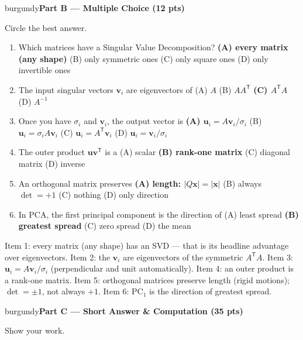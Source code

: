 \documentclass[10pt]{article}
\newcommand{\xx}{\mathbf{x}}
\newcommand{\vv}{\mathbf{v}}
\newcommand{\uu}{\mathbf{u}}
\newcommand{\T}{^{\mathsf T}}
\newcommand{\parthead}[1]{%
  \vspace{6pt}\noindent
  \begin{headlinebox}{burgundy}{\color{white}\bfseries #1}\end{headlinebox}%
  \vspace{4pt}}
\begin{document}
\parthead{Part B --- Multiple Choice (12 pts)}
Circle the best answer.

\begin{enumerate}[leftmargin=1.9em, itemsep=9pt]
  \item Which matrices have a Singular Value Decomposition?
    \hfill \textbf{(A) every matrix (any shape)} \ans{$\leftarrow$} \quad (B) only symmetric ones \quad (C) only square ones \quad (D) only invertible ones
  \item The input singular vectors $\vv_i$ are eigenvectors of
    \hfill (A) $A$ \quad (B) $AA\T$ \quad \textbf{(C) $A\T A$} \ans{$\leftarrow$} \quad (D) $A^{-1}$
  \item Once you have $\sigma_i$ and $\vv_i$, the output vector is
    \hfill \textbf{(A) $\uu_i=A\vv_i/\sigma_i$} \ans{$\leftarrow$} \quad (B) $\uu_i=\sigma_i A\vv_i$ \quad (C) $\uu_i=A\T\vv_i$ \quad (D) $\uu_i=\vv_i/\sigma_i$
  \item The outer product $\uu\vv\T$ is a
    \hfill (A) scalar \quad \textbf{(B) rank-one matrix} \ans{$\leftarrow$} \quad (C) diagonal matrix \quad (D) inverse
  \item An orthogonal matrix preserves
    \hfill \textbf{(A) length: $|Q\xx|=|\xx|$} \ans{$\leftarrow$} \quad (B) always $\det=+1$ \quad (C) nothing \quad (D) only direction
  \item In PCA, the first principal component is the direction of
    \hfill (A) least spread \quad \textbf{(B) greatest spread} \ans{$\leftarrow$} \quad (C) zero spread \quad (D) the mean
\end{enumerate}

\begin{teachernote}
Item 1: every matrix (any shape) has an SVD --- that is its headline advantage over eigenvectors. Item 2: the $\vv_i$
are eigenvectors of the symmetric $A\T A$. Item 3: $\uu_i=A\vv_i/\sigma_i$ (perpendicular and unit automatically).
Item 4: an outer product is a rank-one matrix. Item 5: orthogonal matrices preserve length (rigid motions); $\det=\pm1$,
not always $+1$. Item 6: $\mathrm{PC}_1$ is the direction of greatest spread.
\end{teachernote}

\parthead{Part C --- Short Answer \& Computation (35 pts)}
Show your work.
\end{document}
